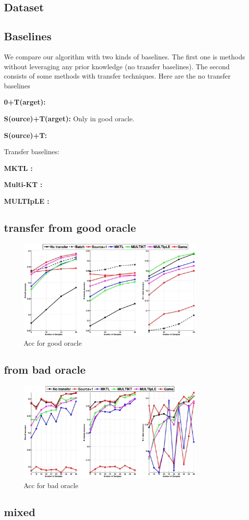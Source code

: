 \subsection{Dataset}

\subsection{Baselines}
We compare our algorithm with two kinds of baselines. The first one is methods without leveraging any prior knowledge (no transfer baselines). The second consists of some methods with transfer techniques. Here are the no transfer baselines 

\textbf{0+T(arget):}

\textbf{S(ource)+T(arget):} Only in good oracle.

\textbf{S(ource)+T:}

Transfer baselines:

\textbf{MKTL \cite{jie2011multiclass}:} 

\textbf{Multi-KT \cite{tommasi2014learning}:}

\textbf{MULTIpLE \cite{kuzborskij2013n}:}

\subsection{transfer from good oracle}
\begin{figure}
\includegraphics[width=\textwidth,height=5cm]{fig/C2C_RBF.eps}
\caption{Acc for good oracle}
\end{figure}

\subsection{from bad oracle}
\begin{figure}
\includegraphics[width=\textwidth,height=5cm]{fig/A2C_RBF_PHOG.eps}
\caption{Acc for bad oracle}
\end{figure}

\subsection{mixed}

